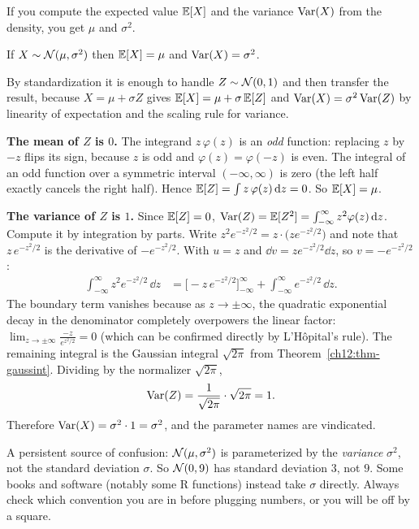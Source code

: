 If you compute the expected value $\operatorname{\mathbb{E}}[X]$ and the variance $\operatorname{Var}(X)$ from the density, you get $\mu$ and $\sigma^2$.

\begin{proposition}
\label{ch12:prop-moments}
If $X \sim \mathcal{N}(\mu,\sigma^2)$ then $\operatorname{\mathbb{E}}[X] = \mu$ and $\operatorname{Var}(X) = \sigma^2$.
\end{proposition}

\begin{whybox}
By standardization it is enough to handle $Z \sim \mathcal{N}(0,1)$ and then transfer
the result, because $X = \mu + \sigma Z$ gives $\operatorname{\mathbb{E}}[X] = \mu + \sigma\operatorname{\mathbb{E}}[Z]$ and
$\operatorname{Var}(X) = \sigma^2 \operatorname{Var}(Z)$ by linearity of expectation and the scaling rule for
variance.

\textbf{The mean of $Z$ is $0$.} The integrand $z\,\varphi(z)$ is an
\emph{odd} function: replacing $z$ by $-z$ flips its sign, because $z$ is odd and
$\varphi(z) = \varphi(-z)$ is even. The integral of an odd function over a
symmetric interval $(-\infty,\infty)$ is zero (the left half exactly cancels the
right half). Hence $\operatorname{\mathbb{E}}[Z] = \int z\,\varphi(z)\,\mathrm{d} z = 0$. So $\operatorname{\mathbb{E}}[X] = \mu$.

\textbf{The variance of $Z$ is $1$.} Since $\operatorname{\mathbb{E}}[Z]=0$, $\operatorname{Var}(Z) = \operatorname{\mathbb{E}}[Z^2] =
\int_{-\infty}^{\infty} z^2 \varphi(z)\,\mathrm{d} z$. Compute it by integration by
parts. Write $z^2 e^{-z^2/2} = z\cdot\big(z e^{-z^2/2}\big)$ and note that
$z\,e^{-z^2/2}$ is the derivative of $-e^{-z^2/2}$. With $u = z$ and
$\dd v = z e^{-z^2/2}\dd z$, so $v = -e^{-z^2/2}$:
\begin{align*}
  \int_{-\infty}^{\infty} z^2 e^{-z^2/2}\,\dd z
   &= \Big[-z\,e^{-z^2/2}\Big]_{-\infty}^{\infty}
     + \int_{-\infty}^{\infty} e^{-z^2/2}\,\dd z.
\end{align*}
The boundary term vanishes because as $z \to \pm\infty$, the quadratic
exponential decay in the denominator completely overpowers the linear factor:
$\lim_{z\to\pm\infty} \frac{-z}{e^{z^2/2}} = 0$ (which can be confirmed
directly by L'H\^opital's rule). The remaining integral is the Gaussian
integral $\sqrt{2\pi}$ from Theorem~\ref{ch12:thm-gaussint}. Dividing by the
normalizer $\sqrt{2\pi}$,
\[
  \operatorname{Var}(Z) = \frac{1}{\sqrt{2\pi}}\cdot \sqrt{2\pi} = 1.
\]
Therefore $\operatorname{Var}(X) = \sigma^2 \cdot 1 = \sigma^2$, and the parameter names are
vindicated.
\end{whybox}

\begin{trapbox}
A persistent source of confusion: $\mathcal{N}(\mu,\sigma^2)$ is parameterized by the
\emph{variance} $\sigma^2$, not the standard deviation $\sigma$. So $\mathcal{N}(0,9)$
has standard deviation $3$, not $9$. Some books and software (notably some R
functions) instead take $\sigma$ directly. Always check which convention you are
in before plugging numbers, or you will be off by a square.
\end{trapbox}

